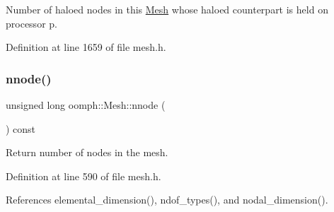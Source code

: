 Number of haloed nodes in this \hyperlink{classoomph_1_1Mesh}{Mesh} whose haloed counterpart is held on processor p. 



Definition at line 1659 of file mesh.\+h.

\mbox{\label{classoomph_1_1Mesh_a945e7823d1a2af243b5b7f7866aaff5e}} 
\subsubsection{\texorpdfstring{nnode()}{nnode()}}
{\footnotesize\ttfamily unsigned long oomph\+::\+Mesh\+::nnode (\begin{DoxyParamCaption}{ }\end{DoxyParamCaption}) const\hspace{0.3cm}{\ttfamily [inline]}}



Return number of nodes in the mesh. 



Definition at line 590 of file mesh.\+h.



References elemental\+\_\+dimension(), ndof\+\_\+types(), and nodal\+\_\+dimension().



